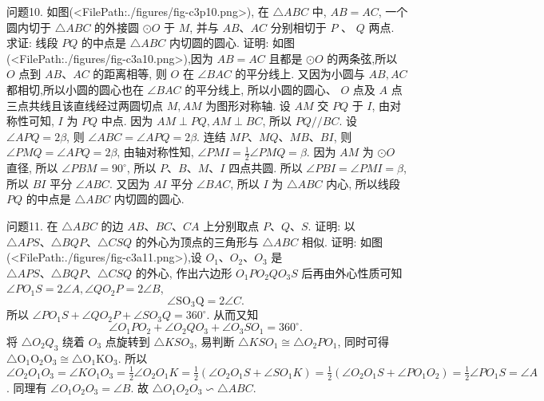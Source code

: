 问题10. 如图(<FilePath:./figures/fig-c3p10.png>), 在 $\triangle A B C$ 中, $A B=A C$, 一个圆内切于 $\triangle A B C$ 的外接圆 $\odot O$ 于 $M$, 并与 $A B 、 A C$ 分别相切于 $P$ 、 $Q$ 两点.
求证: 线段 $P Q$ 的中点是 $\triangle A B C$ 内切圆的圆心.
证明: 如图(<FilePath:./figures/fig-c3a10.png>),因为 $A B=A C$ 且都是 $\odot O$ 的两条弦,所以 $O$ 点到 $A B 、 A C$ 的距离相等, 则 $O$ 在 $\angle B A C$ 的平分线上.
又因为小圆与 $A B, A C$ 都相切,所以小圆的圆心也在 $\angle B A C$ 的平分线上, 所以小圆的圆心、 $O$ 点及 $A$ 点三点共线且该直线经过两圆切点 $M, A M$ 为图形对称轴.
设 $A M$ 交 $P Q$ 于 $I$, 由对称性可知, $I$ 为 $P Q$ 中点.
因为 $A M \perp P Q, A M \perp B C$, 所以 $P Q / / B C$. 设 $\angle A P Q= 2 \beta$, 则 $\angle A B C=\angle A P Q=2 \beta$. 连结 $M P 、 M Q 、 M B 、 B I$, 则 $\angle P M Q=\angle A P Q=2 \beta$, 由轴对称性知, $\angle P M I=\frac{1}{2} \angle P M Q=\beta$. 因为 $A M$ 为 $\odot O$ 直径, 所以 $\angle P B M= 90^{\circ}$, 所以 $P 、 B 、 M 、 I$ 四点共圆.
所以 $\angle P B I=\angle P M I=\beta$, 所以 $B I$ 平分 $\angle A B C$. 又因为 $A I$ 平分 $\angle B A C$, 所以 $I$ 为 $\triangle A B C$ 内心, 所以线段 $P Q$ 的中点是 $\triangle A B C$ 内切圆的圆心.



问题11. 在 $\triangle A B C$ 的边 $A B 、 B C 、 C A$ 上分别取点 $P 、 Q 、 S$. 证明: 以 $\triangle A P S 、 \triangle B Q P 、 \triangle C S Q$ 的外心为顶点的三角形与 $\triangle A B C$ 相似.
证明: 如图(<FilePath:./figures/fig-c3a11.png>),设 $O_1 、 O_2 、 O_3$ 是 $\triangle A P S 、 \triangle B Q P 、 \triangle C S Q$ 的外心, 作出六边形 $O_1 P O_2 Q O_3 S$ 后再由外心性质可知 $\angle P O_1 S=2 \angle A, \angle Q O_2 P=2 \angle B$,
$$
\angle \mathrm{SO}_3 \mathrm{Q}=2 \angle C \text {. }
$$
所以 $\angle P O_1 S+\angle Q O_2 P+\angle S O_3 Q=360^{\circ}$. 从而又知
$$
\angle O_1 P O_2+\angle O_2 Q O_3+\angle O_3 S O_1=360^{\circ} \text {. }
$$
将 $\triangle O_2 Q_3$ 绕着 $O_3$ 点旋转到 $\triangle K S O_3$,
易判断 $\triangle K S O_1 \cong \triangle O_2 P O_1$, 同时可得 $\triangle \mathrm{O}_1 \mathrm{O}_2 \mathrm{O}_3 \cong \triangle \mathrm{O}_1 \mathrm{KO}_3$.
所以 $\angle O_2 O_1 O_3=\angle K O_1 O_3=\frac{1}{2} \angle O_2 O_1 K=\frac{1}{2}\left(\angle O_2 O_1 S+\angle S O_1 K\right)= \frac{1}{2}\left(\angle O_2 O_1 S+\angle P O_1 O_2\right)=\frac{1}{2} \angle P O_1 S=\angle A$. 同理有 $\angle O_1 O_2 O_3=\angle B$. 故 $\triangle O_1 O_2 O_3 \backsim \triangle A B C$.



